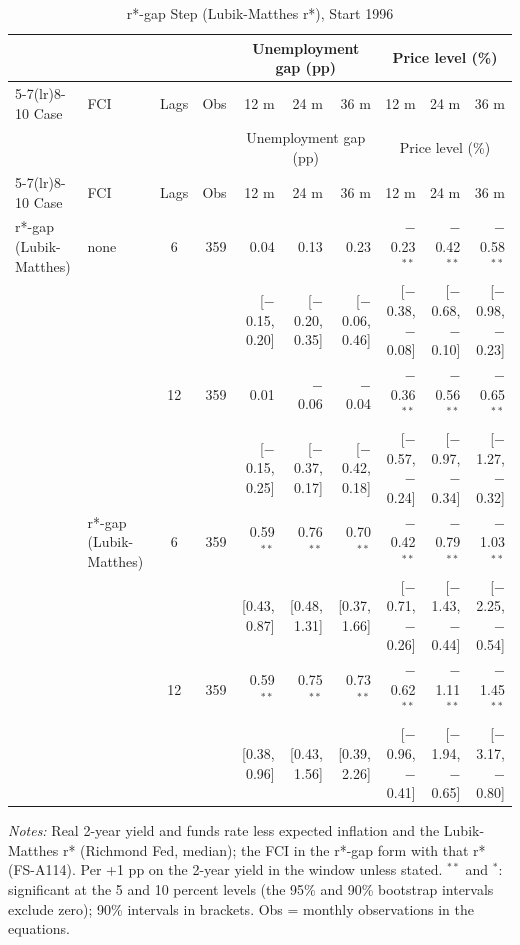 \begingroup\scriptsize\setlength{\tabcolsep}{0.9pt}
\begin{longtable}{llcrrrrrrr}
\caption{r*-gap Step (Lubik-Matthes r*), Start 1996}\label{tab:appF4}\\
\toprule
 & & & & \multicolumn{3}{c}{Unemployment gap (pp)} & \multicolumn{3}{c}{Price level (\%)}\\ \cmidrule(lr){5-7}\cmidrule(lr){8-10}
Case & FCI & Lags & Obs & 12 m & 24 m & 36 m & 12 m & 24 m & 36 m\\
\midrule\endfirsthead
\toprule
 & & & & \multicolumn{3}{c}{Unemployment gap (pp)} & \multicolumn{3}{c}{Price level (\%)}\\ \cmidrule(lr){5-7}\cmidrule(lr){8-10}
Case & FCI & Lags & Obs & 12 m & 24 m & 36 m & 12 m & 24 m & 36 m\\
\midrule\endhead
\bottomrule\endfoot
r*-gap (Lubik-Matthes) & none & 6 & 359 & 0.04 & 0.13 & 0.23 & $-$0.23$^{**}$ & $-$0.42$^{**}$ & $-$0.58$^{**}$\\
 & & & & {\scriptsize [$-$0.15, 0.20]} & {\scriptsize [$-$0.20, 0.35]} & {\scriptsize [$-$0.06, 0.46]} & {\scriptsize [$-$0.38, $-$0.08]} & {\scriptsize [$-$0.68, $-$0.10]} & {\scriptsize [$-$0.98, $-$0.23]}\\
 &  & 12 & 359 & 0.01 & $-$0.06 & $-$0.04 & $-$0.36$^{**}$ & $-$0.56$^{**}$ & $-$0.65$^{**}$\\
 & & & & {\scriptsize [$-$0.15, 0.25]} & {\scriptsize [$-$0.37, 0.17]} & {\scriptsize [$-$0.42, 0.18]} & {\scriptsize [$-$0.57, $-$0.24]} & {\scriptsize [$-$0.97, $-$0.34]} & {\scriptsize [$-$1.27, $-$0.32]}\\
 & r*-gap (Lubik-Matthes) & 6 & 359 & 0.59$^{**}$ & 0.76$^{**}$ & 0.70$^{**}$ & $-$0.42$^{**}$ & $-$0.79$^{**}$ & $-$1.03$^{**}$\\
 & & & & {\scriptsize [0.43, 0.87]} & {\scriptsize [0.48, 1.31]} & {\scriptsize [0.37, 1.66]} & {\scriptsize [$-$0.71, $-$0.26]} & {\scriptsize [$-$1.43, $-$0.44]} & {\scriptsize [$-$2.25, $-$0.54]}\\
 &  & 12 & 359 & 0.59$^{**}$ & 0.75$^{**}$ & 0.73$^{**}$ & $-$0.62$^{**}$ & $-$1.11$^{**}$ & $-$1.45$^{**}$\\
 & & & & {\scriptsize [0.38, 0.96]} & {\scriptsize [0.43, 1.56]} & {\scriptsize [0.39, 2.26]} & {\scriptsize [$-$0.96, $-$0.41]} & {\scriptsize [$-$1.94, $-$0.65]} & {\scriptsize [$-$3.17, $-$0.80]}\\
\end{longtable}
\begin{flushleft}\footnotesize\textit{Notes:} Real 2-year yield and funds rate less expected inflation and the Lubik-Matthes r* (Richmond Fed, median); the FCI in the r*-gap form with that r* (FS-A114). Per +1 pp on the 2-year yield in the window unless stated. $^{**}$ and $^{*}$: significant at the 5 and 10 percent levels (the 95\% and 90\% bootstrap intervals exclude zero); 90\% intervals in brackets. Obs = monthly observations in the equations.\end{flushleft}
\endgroup
